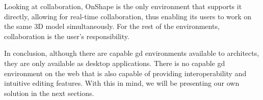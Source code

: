 Looking at collaboration, OnShape is the only environment that supports it directly, allowing for real-time collaboration, thus enabling its users to work on the same 3D model simultaneously.
For the rest of the environments, collaboration is the user's responsibility.

In conclusion, although there are capable \gls{gd} environments available to architects, they are only available as desktop applications.
There is no capable \gls{gd} environment on the web that is also capable of providing interoperability and intuitive editing features.
With this in mind, we will be presenting our own solution in the next sections.
